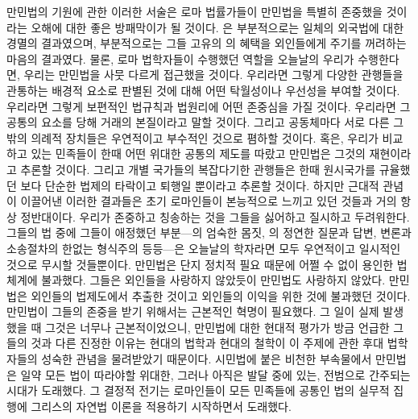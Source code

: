 만민법의 기원에 관한 이러한 서술은
로마 법률가들이 만민법을 특별히 존중했을 것이라는 오해에 대한
좋은 방패막이가 될 것이다.
은 부분적으로는 일체의 외국법에 대한 경멸의 결과였으며,
부분적으로는 그들 고유의 의 혜택을 외인들에게 주기를 꺼려하는
마음의 결과였다.
물론, 로마 법학자들이 수행했던 역할을 오늘날의 우리가 수행한다면,
우리는 만민법을 사뭇 다르게 접근했을 것이다.
우리라면 그렇게 다양한 관행들을 관통하는 배경적 요소로 판별된 것에 대해
어떤 탁월성이나 우선성을 부여할 것이다.
우리라면 그렇게 보편적인 법규칙과 법원리에 어떤 존중심을 가질 것이다.
우리라면 그 공통의 요소를 당해 거래의 본질이라고 말할 것이다.
그리고 공동체마다 서로 다른 그밖의 의례적 장치들은
우연적이고 부수적인 것으로 폄하할 것이다.
혹은, 우리가 비교하고 있는 민족들이 한때 어떤 위대한 공통의 제도를
따랐고 만민법은 그것의 재현이라고 추론할 것이다.
그리고 개별 국가들의 복잡다기한 관행들은 한때 원시국가를 규율했던
보다 단순한 법제의 타락이고 퇴행일 뿐이라고 추론할 것이다.
하지만 근대적 관념이 이끌어낸 이러한 결과들은
초기 로마인들이 본능적으로 느끼고 있던 것들과
거의 항상 정반대이다.
우리가 존중하고 칭송하는 것을 그들을 싫어하고 질시하고 두려워한다.
그들의 법 중에 그들이 애정했던 부분---의 엄숙한 몸짓,
의 정연한 질문과 답변,
변론과 소송절차의 한없는 형식주의 등등---은
오늘날의 학자라면 모두 우연적이고 일시적인 것으로 무시할 것들뿐이다.
만민법은 단지 정치적 필요 때문에 어쩔 수 없이 용인한 법체계에 불과했다.
그들은 외인들을 사랑하지 않았듯이 만민법도 사랑하지 않았다.
만민법은 외인들의 법제도에서 추출한 것이고 외인들의 이익을 위한 것에 불과했던
것이다.
만민법이 그들의 존중을 받기 위해서는 근본적인 혁명이 필요했다.
그 일이 실제 발생했을 때 그것은 너무나 근본적이었으니,
만민법에 대한 현대적 평가가 방금 언급한 그들의 것과 다른 진정한 이유는
현대의 법학과 현대의 철학이
이 주제에 관한 후대 법학자들의 성숙한 관념을
물려받았기 때문이다.
시민법에 붙은 비천한 부속물에서
만민법은 일약 모든 법이 따라야할 위대한, 그러나 아직은 발달 중에 있는,
전범으로 간주되는 시대가 도래했다.
그 결정적 전기는
로마인들이
모든 민족들에 공통인 법의 실무적 집행에
그리스의 자연법 이론을
적용하기 시작하면서 도래했다.

